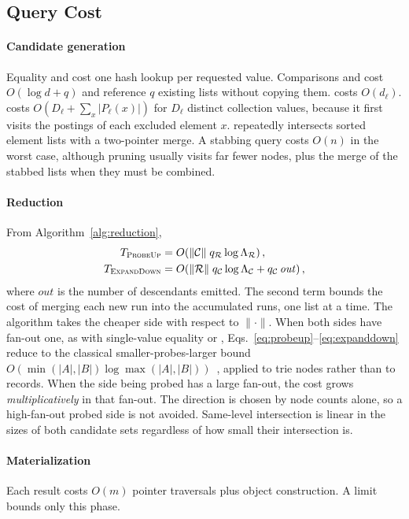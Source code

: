 \subsection{Query Cost}
\paragraph*{Candidate generation} Equality and  cost one hash lookup per requested value. Comparisons and  cost $O(\log d + q)$ and reference $q$ existing lists without copying them.  costs $O(d_\ell)$.  costs $O(D_\ell+\sum_x|P_\ell(x)|)$ for $D_\ell$ distinct collection values, because it first visits the postings of each excluded element $x$.  repeatedly intersects sorted element lists with a two-pointer merge. A stabbing query costs $O(n)$ in the worst case, although pruning usually visits far fewer nodes, plus the merge of the stabbed lists when they must be combined.

\paragraph*{Reduction} From Algorithm~\ref{alg:reduction},
\begin{align}
T_{\textsc{ProbeUp}}    &= O\!\left(\|\mathcal{C}\|\; q_{\mathcal{R}} \log \Lambda_{\mathcal{R}}\right), \label{eq:probeup}\\
T_{\textsc{ExpandDown}} &= O\!\left(\|\mathcal{R}\|\; q_{\mathcal{C}} \log \Lambda_{\mathcal{C}} + q_{\mathcal{C}}\,\mathit{out}\right), \label{eq:expanddown}
\end{align}
where $\mathit{out}$ is the number of descendants emitted. The second term bounds the cost of merging each new run into the accumulated runs, one list at a time. The algorithm takes the cheaper side with respect to $\|\cdot\|$. When both sides have fan-out one, as with single-value equality or , Eqs.~\eqref{eq:probeup}--\eqref{eq:expanddown} reduce to the classical smaller-probes-larger bound $O(\min(|A|,|B|)\log\max(|A|,|B|))$~\cite{baezayates2004fast}, applied to trie nodes rather than to records. When the side being probed has a large fan-out, the cost grows \emph{multiplicatively} in that fan-out. The direction is chosen by node counts alone, so a high-fan-out probed side is not avoided. Same-level intersection is linear in the sizes of both candidate sets regardless of how small their intersection is.

\paragraph*{Materialization} Each result costs $O(m)$ pointer traversals plus object construction. A limit bounds only this phase.

